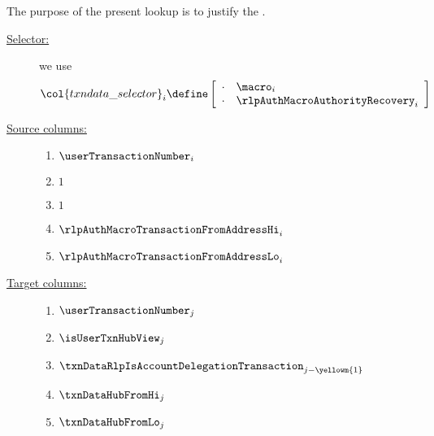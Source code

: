 The purpose of the present lookup is to justify the
\transactionFromAddress{}.
\begin{description}
	\item[\underline{Selector:}]
		we use
		\[
			\col{txndata\_selector} _{i} \define
			\left[ \begin{array}{cl}
				\cdot & \macro                         _{i} \\
				\cdot & \rlpAuthMacroAuthorityRecovery _{i} \\
			\end{array} \right]
		\]
	\item[\underline{Source columns:}]
		\begin{multicols}{2}
			\begin{enumerate}
				\item $\userTransactionNumber                _{i}$
				\item $1$
				\item $1$
				\item $\rlpAuthMacroTransactionFromAddressHi _{i}$
				\item $\rlpAuthMacroTransactionFromAddressLo _{i}$
			\end{enumerate}
		\end{multicols}
	\item[\underline{Target columns:}]
		\begin{multicols}{2}
			\begin{enumerate}
				\item $\userTransactionNumber                    _{j}$
				\item $\isUserTxnHubView                         _{j}$
				\item $\txnDataRlpIsAccountDelegationTransaction _{j - \yellowm{1}}$
				\item $\txnDataHubFromHi                         _{j}$
				\item $\txnDataHubFromLo                         _{j}$
			\end{enumerate}
		\end{multicols}
\end{description}
